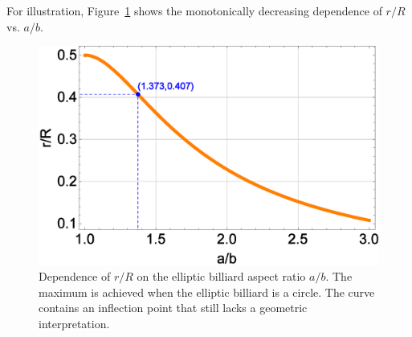 For illustration, Figure~\ref{fig:rovR-vs-ab} shows the monotonically decreasing dependence of $r/R$ vs. $a/b$.

\begin{figure}[H]
    \centering
    \includegraphics[width=.60\textwidth]{1030_rR_vs_ab.eps}
    \caption{Dependence of $r/R$ on the elliptic billiard aspect ratio $a/b$. The maximum is achieved when the elliptic billiard is a circle. The curve contains an inflection point that still lacks a geometric interpretation.}
    \label{fig:rovR-vs-ab}
\end{figure}


